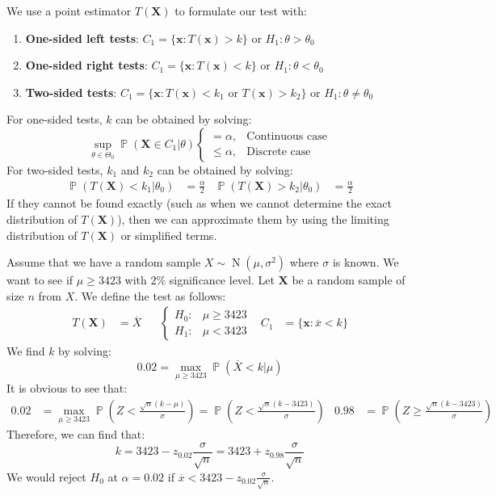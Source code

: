 \documentclass{huhtakm-template-book-v2}
\DeclareMathOperator{\prob}{\mathbb{P}}
\DeclareMathOperator{\N}{N}
\begin{document}
\begin{rem}
	We use a point estimator $T(\mathbf{X})$ to formulate our test with:
	\begin{enumerate}
		\item \textbf{One-sided left tests}: $C_{1}=\{\mathbf{x}:T(\mathbf{x})>k\}$ or $H_{1}:\theta>\theta_{0}$
		\item \textbf{One-sided right tests}: $C_{1}=\{\mathbf{x}:T(\mathbf{x})<k\}$ or $H_{1}:\theta<\theta_{0}$
		\item \textbf{Two-sided tests}: $C_{1}=\{\mathbf{x}:T(\mathbf{x})<k_{1}\text{ or }T(\mathbf{x})>k_{2}\}$ or $H_{1}:\theta\neq\theta_{0}$
	\end{enumerate}
	For one-sided tests, $k$ can be obtained by solving:
	\begin{equation*}
		\sup_{\theta\in\Theta_{0}}\prob(\mathbf{X}\in C_{1}|\theta)\begin{cases}
			=\alpha, &\text{Continuous case}\\
			\leq\alpha, &\text{Discrete case}
		\end{cases}
	\end{equation*}
	For two-sided tests, $k_{1}$ and $k_{2}$ can be obtained by solving:
	\begin{align*}
		\prob(T(\mathbf{X})<k_{1}|\theta_{0})&=\frac{\alpha}{2} & \prob(T(\mathbf{X})>k_{2}|\theta_{0})&=\frac{\alpha}{2}
	\end{align*}
	If they cannot be found exactly (such as when we cannot determine the exact distribution of $T(\mathbf{X})$), then we can approximate them by using the limiting distribution of $T(\mathbf{X})$ or simplified terms.
\end{rem}
\begin{eg}
	Assume that we have a random sample $X\sim\N(\mu,\sigma^{2})$ where $\sigma$ is known. We want to see if $\mu\geq 3423$ with $2\%$ significance level. Let $\mathbf{X}$ be a random sample of size $n$ from $X$. We define the test as follows:
	\begin{align*}
		T(\mathbf{X})&=\overline{X} & &\begin{cases}
			H_{0}: &\mu\geq3423\\
			H_{1}: &\mu<3423
		\end{cases} & C_{1}&=\{\mathbf{x}:\overline{x}<k\}
	\end{align*}
	We find $k$ by solving:
	\begin{equation*}
		0.02=\max_{\mu\geq3423}\prob(\overline{X}<k|\mu)
	\end{equation*}
	It is obvious to see that:
	\begin{align*}
		0.02&=\max_{\mu\geq3423}\prob\left(Z<\frac{\sqrt{n}(k-\mu)}{\sigma}\right)=\prob\left(Z<\frac{\sqrt{n}(k-3423)}{\sigma}\right) & 0.98&=\prob\left(Z\geq\frac{\sqrt{n}(k-3423)}{\sigma}\right)
	\end{align*}
	Therefore, we can find that:
	\begin{equation*}
		k=3423-z_{0.02}\frac{\sigma}{\sqrt{n}}=3423+z_{0.98}\frac{\sigma}{\sqrt{n}}
	\end{equation*}
	We would reject $H_{0}$ at $\alpha=0.02$ if $\overline{x}<3423-z_{0.02}\frac{\sigma}{\sqrt{n}}$.
\end{eg}
\end{document}
